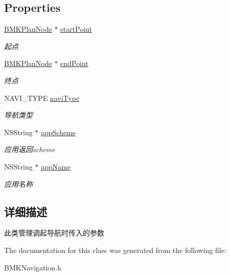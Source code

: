 \subsection*{Properties}
\begin{DoxyCompactItemize}
\item 
\hypertarget{interface_navi_para_a4e8d97c64f7010605efa9dfca65b44ba}{\hyperlink{interface_b_m_k_plan_node}{B\-M\-K\-Plan\-Node} $\ast$ \hyperlink{interface_navi_para_a4e8d97c64f7010605efa9dfca65b44ba}{start\-Point}}\label{interface_navi_para_a4e8d97c64f7010605efa9dfca65b44ba}

\begin{DoxyCompactList}\small\item\em 起点 \end{DoxyCompactList}\item 
\hypertarget{interface_navi_para_a4c73ace4bca1c405c11e68b82db44cf1}{\hyperlink{interface_b_m_k_plan_node}{B\-M\-K\-Plan\-Node} $\ast$ \hyperlink{interface_navi_para_a4c73ace4bca1c405c11e68b82db44cf1}{end\-Point}}\label{interface_navi_para_a4c73ace4bca1c405c11e68b82db44cf1}

\begin{DoxyCompactList}\small\item\em 终点 \end{DoxyCompactList}\item 
\hypertarget{interface_navi_para_aa714cc9eceea14950b98c248fcea910a}{N\-A\-V\-I\-\_\-\-T\-Y\-P\-E \hyperlink{interface_navi_para_aa714cc9eceea14950b98c248fcea910a}{navi\-Type}}\label{interface_navi_para_aa714cc9eceea14950b98c248fcea910a}

\begin{DoxyCompactList}\small\item\em 导航类型 \end{DoxyCompactList}\item 
\hypertarget{interface_navi_para_a9ee28287ebd21b31c975774292d9574b}{N\-S\-String $\ast$ \hyperlink{interface_navi_para_a9ee28287ebd21b31c975774292d9574b}{app\-Scheme}}\label{interface_navi_para_a9ee28287ebd21b31c975774292d9574b}

\begin{DoxyCompactList}\small\item\em 应用返回scheme \end{DoxyCompactList}\item 
\hypertarget{interface_navi_para_a04f3b2c5862d721c474eba10399a3079}{N\-S\-String $\ast$ \hyperlink{interface_navi_para_a04f3b2c5862d721c474eba10399a3079}{app\-Name}}\label{interface_navi_para_a04f3b2c5862d721c474eba10399a3079}

\begin{DoxyCompactList}\small\item\em 应用名称 \end{DoxyCompactList}\end{DoxyCompactItemize}


\subsection{详细描述}
此类管理调起导航时传入的参数 

The documentation for this class was generated from the following file\-:\begin{DoxyCompactItemize}
\item 
B\-M\-K\-Navigation.\-h\end{DoxyCompactItemize}
